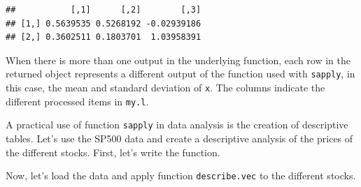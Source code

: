 \documentclass[11pt,]{book}
\newenvironment{Shaded}{\begin{snugshade}}{\end{snugshade}}
\newcommand{\KeywordTok}[1]{\textcolor[rgb]{0.27,0.27,0.27}{\textbf{#1}}}
\newcommand{\DataTypeTok}[1]{\textcolor[rgb]{0.27,0.27,0.27}{#1}}
\newcommand{\StringTok}[1]{\textcolor[rgb]{0.5,0.5,0.5}{#1}}
\newcommand{\CommentTok}[1]{\textcolor[rgb]{0.56,0.35,0.01}{\textit{#1}}}
\newcommand{\ControlFlowTok}[1]{\textcolor[rgb]{0.13,0.29,0.53}{\textbf{#1}}}
\newcommand{\OperatorTok}[1]{\textcolor[rgb]{0.81,0.36,0.00}{\textbf{#1}}}
\newcommand{\NormalTok}[1]{#1}
\begin{document}
\begin{verbatim}
##           [,1]      [,2]        [,3]
## [1,] 0.5639535 0.5268192 -0.02939186
## [2,] 0.3602511 0.1803701  1.03958391
\end{verbatim}

When there is more than one output in the underlying function, each row
in the returned object represents a different output of the function
used with \texttt{sapply}, in this case, the mean and standard deviation
of \texttt{x}. The columns indicate the different processed items in
\texttt{my.l}.

A practical use of function \texttt{sapply} in data analysis is the
creation of descriptive tables. Let's use the SP500 data and create a
descriptive analysis of the prices of the different stocks. First, let's
write the function.

\begin{Shaded}
\end{Shaded}

Now, let's load the data and apply function \texttt{describe.vec} to the
different stocks. 
\end{document}
